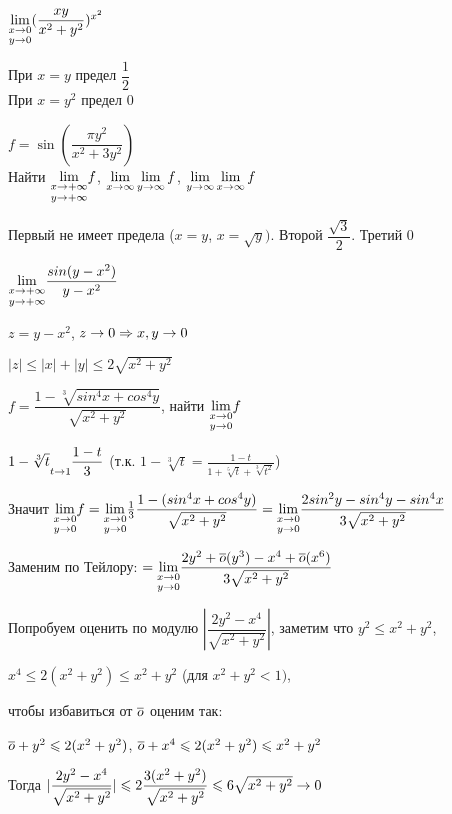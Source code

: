 \documentclass[main]{subfiles}
\begin{document}
  \begin{example}
      $\underset{y \rightarrow 0}{\lim\limits_{x \rightarrow 0}} (\dfrac{x y}{x^2+y^2})^{x^2}$
  \end{example}

  \begin{sol}
      При $x=y$ предел $\dfrac{1}{2}$\\
      При $x=y^2$ предел 0
  \end{sol}

  \begin{example}
      $f=\sin(\dfrac{\pi y^2}{x^2 + 3y^2})$\\
      Найти $\underset{y \rightarrow +\infty}{\lim\limits_{x \rightarrow +\infty}} f$, $\lim\limits_{x \rightarrow \infty} \lim\limits_{y \rightarrow \infty} f$, $\lim\limits_{y \rightarrow \infty} \lim\limits_{x \rightarrow \infty} f$
  \end{example}

  \begin{sol}
      Первый не имеет предела ($x=y$, $x=\sqrt{y})$. Второй $\dfrac{\sqrt{3}}{2}$. Третий 0
  \end{sol}

  \begin{example}
      $\underset{y \rightarrow +\infty}{\lim\limits_{x \rightarrow +\infty}} \dfrac{sin(y-x^2)}{y-x^2}$
  \end{example}

  \begin{sol}
      $z=y-x^2$, $z \rightarrow 0 \Rightarrow x,y \rightarrow 0$

      $|z| \leqslant |x| + |y| \leqslant 2 \sqrt{x^2+y^2}$
  \end{sol}

  \begin{example}
      $f=\dfrac{1-\sqrt[3]{sin^4 x + cos^4 y}}{\sqrt{x^2+y^2}}$, найти $\underset{y \rightarrow 0}{\lim\limits_{x \rightarrow 0}} f$
  \end{example}

  \begin{sol}
      $1-\sqrt[3]{t} \underset{t \rightarrow 1}{~} \dfrac{1-t}{3}$ (т.к. $1-\sqrt[3]{t}=\frac{1-t}{1+\sqrt[5]{t}+\sqrt[3]{t^2}}$)

      Значит $\underset{y \rightarrow 0}{\lim\limits_{x \rightarrow 0}} f = \underset{y \rightarrow 0}{\lim\limits_{x \rightarrow 0}} \frac{1}{3} \dfrac{1-(sin^4 x + cos^4 y)}{\sqrt{x^2+y^2}} = \underset{y \rightarrow 0}{\lim\limits_{x \rightarrow 0}} \dfrac{2sin^2 y - sin^4 y - sin^4 x}{3 \sqrt{x^2+y^2}}$

      Заменим по Тейлору: $=\underset{y \rightarrow 0}{\lim\limits_{x \rightarrow 0}} \dfrac{2y^2 + \overline{o}(y^3)-x^4 + \overline{o}(x^6)}{3 \sqrt{x^2+y^2}}$

      Попробуем оценить по модулю $|\dfrac{2y^2-x^4}{\sqrt{x^2+y^2}}|$, заметим что $y^2 \leqslant x^2 + y^2$,

      $x^4 \leqslant 2(x^2+y^2) \leqslant x^2+y^2$ (для $x^2+y^2 < 1)$,

      чтобы избавиться от $\overline{o}$ оценим так:

      $\overline{o} + y^2 \leqslant 2(x^2 + y^2)$, $\overline{o} + x^4 \leqslant 2(x^2+y^2) \leqslant x^2+y^2$

      Тогда $|\dfrac{2y^2-x^4}{\sqrt{x^2+y^2}}| \leqslant 2 \dfrac{3(x^2+y^2)}{\sqrt{x^2+y^2}} \leqslant 6 \sqrt{x^2+y^2} \rightarrow 0$
  \end{sol}
\end{document}

